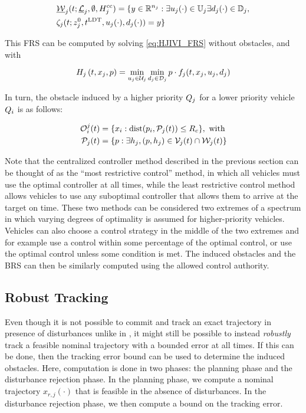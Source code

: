 \begin{equation}
\label{eq:FRS2_lrc}
\begin{aligned}
&\underline\frs_j(t; \underline\targetset_j, \emptyset, \ccham_j) = \{y \in \R^{n_j}:\exists \ctrl_j(\cdot) \in \cfset_j \exists \dstb_j(\cdot) \in \dfset_j, \\
&\traj_j(t; \state^0_j, \ldt, \ctrl_j(\cdot), \dstb_j(\cdot) )= y\}
\end{aligned}
\end{equation}

This FRS can be computed by solving \eqref{eq:HJIVI_FRS} without obstacles, and with

\begin{equation}
H_j\left(t, x_j, p\right) = \min_{u_j \in \mathcal{U}_j} \min_{d_j \in \mathcal{D}_j} p \cdot f_j(t, x_j, u_j, d_j)
\end{equation}

In turn, the obstacle induced by a higher priority $Q_{j}$ for a lower priority vehicle $Q_{i}$ is as follows:

\begin{equation}
\begin{aligned}
\mathcal{O}_i^j(t) &= \{x_i: \text{dist}(p_i, \mathcal{P}_j(t)) \le R_c \}, \text{ with} \\
\mathcal{P}_j(t) &= \{p: \exists h_j, (p, h_j) \in \mathcal{V}_j(t) \cap \mathcal{W}_j(t)\}
\end{aligned}
\end{equation}

Note that the centralized controller method described in the previous section can be thought of as the ``most restrictive control'' method, in which all vehicles must use the optimal controller at all times, while the least restrictive control method allows vehicles to use any suboptimal controller that allows them to arrive at the target on time. These two methods can be considered two extremes of a spectrum in which varying degrees of optimality is assumed for higher-priority vehicles. Vehicles can also choose a control strategy in the middle of the two extremes and for example use a control within some percentage of the optimal control, or use the optimal control unless some condition is met. The induced obstacles and the BRS can then be similarly computed using the allowed control authority.

\subsection{Robust Tracking} \label{sec:incomp_robust}
Even though it is not possible to commit and track an exact trajectory in presence of disturbances unlike in \cite{Chen15}, it might still be possible to instead \textit{robustly} track a feasible nominal trajectory with a bounded error at all times. If this can be done, then the tracking error bound can be used to determine the induced obstacles. Here, computation is done in two phases: the planning phase and the disturbance rejection phase. In the planning phase, we compute a nominal trajectory $x_{r,j}(\cdot)$ that is feasible in the absence of disturbances. In the disturbance rejection phase, we then compute a bound on the tracking error.

